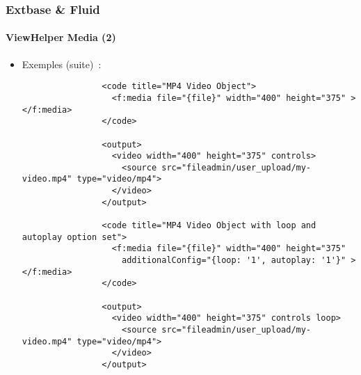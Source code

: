 \begin{frame}[fragile]
	\frametitle{Extbase \& Fluid}
	\framesubtitle{ViewHelper Media (2)}

	\lstset{basicstyle=\tiny\ttfamily}

	\begin{itemize}

		\item Exemples (suite)~:

			\begin{lstlisting}
				<code title="MP4 Video Object">
				  <f:media file="{file}" width="400" height="375" ></f:media>
				</code>

				<output>
				  <video width="400" height="375" controls>
				    <source src="fileadmin/user_upload/my-video.mp4" type="video/mp4">
				  </video>
				</output>

				<code title="MP4 Video Object with loop and autoplay option set">
				  <f:media file="{file}" width="400" height="375"
				    additionalConfig="{loop: '1', autoplay: '1'}" ></f:media>
				</code>

				<output>
				  <video width="400" height="375" controls loop>
				    <source src="fileadmin/user_upload/my-video.mp4" type="video/mp4">
				  </video>
				</output>
			\end{lstlisting}

	\end{itemize}

\end{frame}


